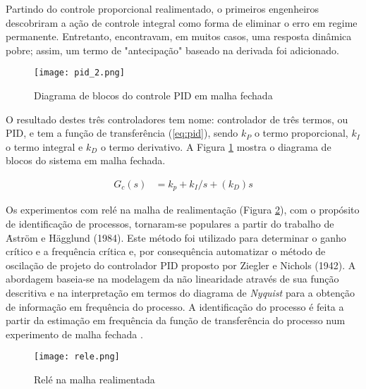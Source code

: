 \begin{citacao}
	Partindo do controle proporcional realimentado, o primeiros engenheiros descobriram a ação de controle integral como forma de eliminar o erro em regime permanente. Entretanto, encontravam, em muitos casos, uma resposta dinâmica pobre; assim, um termo de "antecipação" baseado na derivada foi adicionado. \cite[p. -160]{FRANKLIN:2013}
\end{citacao}

\begin{figure}[!h]
	\caption{\label{fig:block_pid}Diagrama de blocos do controle PID em malha fechada}
	\begin{center}
		\texttt{[image: pid\_2.png]}
	\end{center}
\end{figure}

O resultado destes três controladores tem nome: controlador de três termos, ou PID, e tem a função de transferência (\ref{eq:pid}), sendo $k_P$ o termo proporcional, $k_I$ o termo integral e $k_D$ o termo derivativo. A Figura \ref{fig:block_pid} mostra o diagrama de blocos do sistema em malha fechada.


\begin{equation}
	\label{eq:pid}
	\begin{split}
	G_c(s) 	&=	k_p + k_I/s + (k_D)s
	\end{split}
\end{equation}
	
Os experimentos com relé na malha de realimentação (Figura \ref{fig:rele_malha}), com o propósito de identificação de processos, tornaram-se populares a partir do trabalho de \.{A}str\"{o}m e H\"{a}gglund (1984). Este método foi utilizado para determinar o ganho crítico e a frequência crítica e, por consequência automatizar o método de oscilação de projeto do controlador PID proposto por Ziegler e Nichols (1942). A abordagem baseia-se na modelagem da não linearidade através de sua função descritiva e na interpretação em termos do diagrama de \emph{Nyquist} para a obtenção de informação em frequência do processo. A identificação do processo é feita a partir da estimação em frequência da função de transferência do processo num experimento de malha fechada \cite{COELHO:2015}.

\begin{figure}[!h]
	\caption{\label{fig:rele_malha}Relé na malha realimentada}
	\begin{center}
		\texttt{[image: rele.png]}
	\end{center}
\end{figure}

